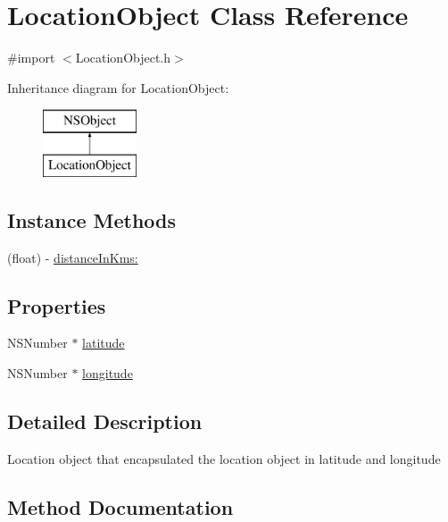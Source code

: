 \hypertarget{interface_location_object}{}\section{Location\+Object Class Reference}
\label{interface_location_object}


{\ttfamily \#import $<$Location\+Object.\+h$>$}

Inheritance diagram for Location\+Object\+:\begin{figure}[H]
\begin{center}
\leavevmode
\includegraphics[height=2.000000cm]{interface_location_object}
\end{center}
\end{figure}
\subsection*{Instance Methods}
\begin{DoxyCompactItemize}
\item 
(float) -\/ \hyperlink{interface_location_object_a2c64b80ba7cf8c232e3a65563201e2e1}{distance\+In\+Kms\+:}
\end{DoxyCompactItemize}
\subsection*{Properties}
\begin{DoxyCompactItemize}
\item 
N\+S\+Number $\ast$ \hyperlink{interface_location_object_a59867a07cde7d38ff9767c46c3d6fab9}{latitude}
\item 
N\+S\+Number $\ast$ \hyperlink{interface_location_object_aee0cf2286452a00fd6a1da3cccd8a3db}{longitude}
\end{DoxyCompactItemize}


\subsection{Detailed Description}
Location object that encapsulated the location object in latitude and longitude 

\subsection{Method Documentation}
